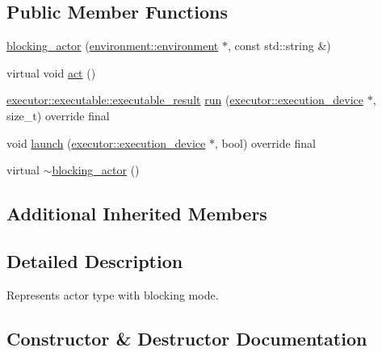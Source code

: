 \subsection*{Public Member Functions}
\begin{DoxyCompactItemize}
\item 
\hyperlink{classactor__zeta_1_1actor_1_1blocking__actor_ab62ea915e7f8597c5f926374a7ab9980}{blocking\+\_\+actor} (\hyperlink{classactor__zeta_1_1environment_1_1environment}{environment\+::environment} $\ast$, const std\+::string \&)
\item 
virtual void \hyperlink{classactor__zeta_1_1actor_1_1blocking__actor_addc9a92e1d9be856cc1842a5c43867f5}{act} ()
\item 
\hyperlink{structactor__zeta_1_1executor_1_1executable_aef06c63be7b22b021ade4b83ed4f3cc4}{executor\+::executable\+::executable\+\_\+result} \hyperlink{classactor__zeta_1_1actor_1_1blocking__actor_af92ae4139344b002f8014433f64f8e56}{run} (\hyperlink{structactor__zeta_1_1executor_1_1execution__device}{executor\+::execution\+\_\+device} $\ast$, size\+\_\+t) override final
\item 
void \hyperlink{classactor__zeta_1_1actor_1_1blocking__actor_a7988829bb7d264b3f226f8c5d4156cb1}{launch} (\hyperlink{structactor__zeta_1_1executor_1_1execution__device}{executor\+::execution\+\_\+device} $\ast$, bool) override final
\item 
virtual \hyperlink{classactor__zeta_1_1actor_1_1blocking__actor_ad78b5512e561def8197df4f5cfbba540}{$\sim$blocking\+\_\+actor} ()
\end{DoxyCompactItemize}
\subsection*{Additional Inherited Members}


\subsection{Detailed Description}
Represents actor type with blocking mode. 

\subsection{Constructor \& Destructor Documentation}
\mbox{\label{classactor__zeta_1_1actor_1_1blocking__actor_ab62ea915e7f8597c5f926374a7ab9980}} 
